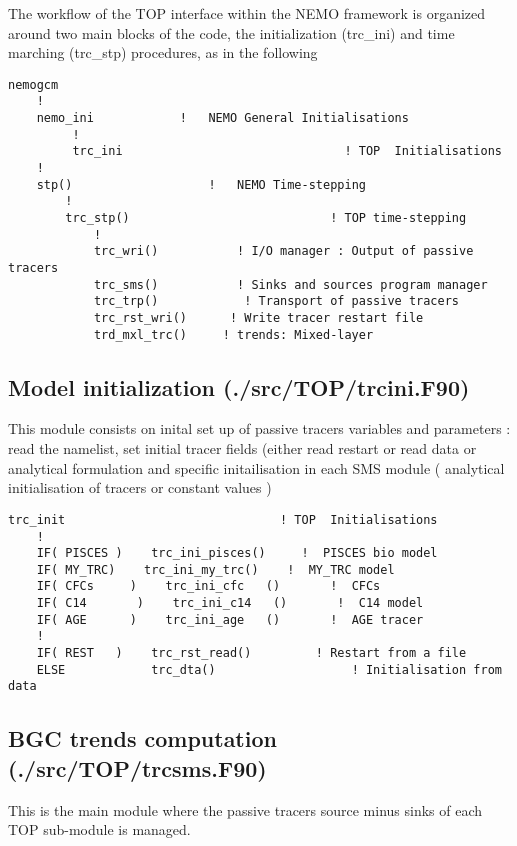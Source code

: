 \documentclass[../main/TOP_manual]{subfiles}
\begin{document}
\pagebreak

The workflow of the TOP interface within the NEMO framework is organized around two main blocks of the code, the initialization (trc\_ini) and time marching (trc\_stp) procedures, as in the following

\begin{verbatim}
nemogcm
    !
    nemo_ini            !   NEMO General Initialisations
         !
         trc_ini                               ! TOP  Initialisations
    !
    stp()                   !   NEMO Time-stepping
        !
        trc_stp()                            ! TOP time-stepping
            !
            trc_wri()           ! I/O manager : Output of passive tracers
            trc_sms()           ! Sinks and sources program manager
            trc_trp()            ! Transport of passive tracers
            trc_rst_wri()      ! Write tracer restart file
            trd_mxl_trc()     ! trends: Mixed-layer
\end{verbatim}

\subsection*{Model initialization (./src/TOP/trcini.F90)}

This module consists on inital set up of passive tracers variables and parameters  : read the namelist, set initial tracer fields (either read restart or read data or analytical formulation and  specific initailisation in each SMS module  ( analytical initialisation of tracers or constant values )

\begin{verbatim}
trc_init                              ! TOP  Initialisations
    !
    IF( PISCES )    trc_ini_pisces()     !  PISCES bio model
    IF( MY_TRC)    trc_ini_my_trc()    !  MY_TRC model
    IF( CFCs     )    trc_ini_cfc   ()       !  CFCs
    IF( C14       )    trc_ini_c14   ()       !  C14 model
    IF( AGE      )    trc_ini_age   ()       !  AGE tracer
    !
    IF( REST   )    trc_rst_read()         ! Restart from a file
    ELSE            trc_dta()                   ! Initialisation from data
\end{verbatim}

\subsection*{BGC trends computation (./src/TOP/trcsms.F90)}

This is the main module where the passive tracers source minus sinks of each TOP sub-module is managed.
\end{document}
